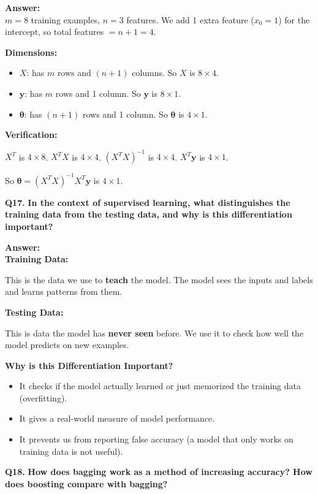\documentclass[12pt,a4paper]{article}
\newcommand{\question}[2]{%
    \begin{mdframed}[style=questionstyle]
        \textbf{\textcolor{headerblue}{Q#1.}} \textbf{#2}
    \end{mdframed}%
    \vspace{2pt}%
}
\newcommand{\ans}{\textbf{\textcolor{headerblue}{Answer:}}\\[4pt]}
\newcommand{\subhead}[1]{\textbf{\textcolor{headerblue}{#1}}}
\begin{document}
\ans

$m = 8$ training examples, $n = 3$ features. We add 1 extra feature ($x_0 = 1$) for the intercept, so total features $= n + 1 = 4$.

\subhead{Dimensions:}
\begin{itemize}[leftmargin=*]
    \item $X$: has $m$ rows and $(n+1)$ columns. So $X$ is $8 \times 4$.
    \item $\mathbf{y}$: has $m$ rows and 1 column. So $\mathbf{y}$ is $8 \times 1$.
    \item $\boldsymbol{\theta}$: has $(n+1)$ rows and 1 column. So $\boldsymbol{\theta}$ is $4 \times 1$.
\end{itemize}

\subhead{Verification:}

$X^T$ is $4 \times 8$. \quad $X^T X$ is $4 \times 4$. \quad $(X^T X)^{-1}$ is $4 \times 4$. \quad $X^T \mathbf{y}$ is $4 \times 1$.

So $\boldsymbol{\theta} = (X^T X)^{-1} X^T \mathbf{y}$ is $4 \times 1$. \checkmark

\vspace{10pt}
\question{17}{In the context of supervised learning, what distinguishes the training data from the testing data, and why is this differentiation important?}

\ans

\subhead{Training Data:}

This is the data we use to \textbf{teach} the model. The model sees the inputs and labels and learns patterns from them.

\subhead{Testing Data:}

This is data the model has \textbf{never seen} before. We use it to check how well the model predicts on new examples.

\subhead{Why is this Differentiation Important?}
\begin{itemize}[leftmargin=*]
    \item It checks if the model actually learned or just memorized the training data (overfitting).
    \item It gives a real-world measure of model performance.
    \item It prevents us from reporting false accuracy (a model that only works on training data is not useful).
\end{itemize}

\vspace{10pt}
\question{18}{How does bagging work as a method of increasing accuracy? How does boosting compare with bagging?}
\end{document}
